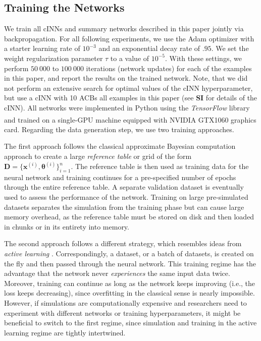 \documentclass[9pt,twoside,lineno]{pnas-new}
\begin{document}
\subsection*{Training the Networks}
We train all cINNs and summary networks described in this paper jointly via backpropagation. For all following experiments, we use the Adam optimizer  with a starter learning rate of $10^{-3}$ and an exponential decay rate of $.95$. We set the weight regularization parameter $\tau$ to a value of $10^{-5}$. With these settings, we perform $50\ 000$ to $100\ 000$ iterations (network updates) for each of the examples in this paper, and report the results on the trained network. Note, that we did not perform an extensive search for optimal values of the cINN hyperparameter, but use a cINN with 10 ACBs all examples in this paper (see \textbf{SI} for details of the cINN). All networks were implemented in Python using the \textit{TensorFlow} library \cite{abadi2016tensorflow} and trained on a single-GPU machine equipped with NVIDIA\textsuperscript{\textregistered} GTX1060 graphics card. Regarding the data generation step, we use two training approaches. 

The first approach follows the classical approximate Bayesian computation approach to create a large \textit{reference table} or grid of the form $\boldsymbol{D} = \{\boldsymbol{x}^{(i)}, \boldsymbol{\theta}^{(i)}\}_{i=1}^{n}$. The reference table is then used as training data for the neural network and training continues for a pre-specified number of epochs through the entire reference table. A separate validation dataset is eventually used to assess the performance of the network. Training on large pre-simulated datasets separates the simulation from the training phase but can cause large memory overhead, as the reference table must be stored on disk and then loaded in chunks or in its entirety into memory. 

The second approach follows a different strategy, which resembles ideas from \textit{active learning} \cite{mnih2015human}. Correspondingly, a dataset, or a batch of datasets, is created on the fly and then passed through the neural network. This training regime has the advantage that the network never \textit{experiences} the same input data twice. Moreover, training can continue as long as the network keeps improving (i.e., the loss keeps decreasing), since overfitting in the classical sense is nearly impossible. However, if simulations are computationally expensive and researchers need to experiment with different networks or training hyperparameters, it might be beneficial to switch to the first regime, since simulation and training in the active learning regime are tightly intertwined.
\end{document}
